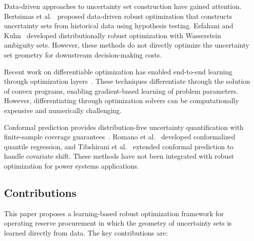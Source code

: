 \documentclass[lettersize,journal]{IEEEtran}
\theoremstyle{definition}
\begin{document}
Data-driven approaches to uncertainty set construction have gained attention. Bertsimas et al.~\cite{Bertsimas2018} proposed data-driven robust optimization that constructs uncertainty sets from historical data using hypothesis testing. Esfahani and Kuhn~\cite{Esfahani2018} developed distributionally robust optimization with Wasserstein ambiguity sets. However, these methods do not directly optimize the uncertainty set geometry for downstream decision-making costs.

Recent work on differentiable optimization has enabled end-to-end learning through optimization layers~\cite{Amos2017,Agrawal2019}. These techniques differentiate through the solution of convex programs, enabling gradient-based learning of problem parameters. However, differentiating through optimization solvers can be computationally expensive and numerically challenging.

Conformal prediction provides distribution-free uncertainty quantification with finite-sample coverage guarantees~\cite{Vovk2005}. Romano et al.~\cite{Romano2019} developed conformalized quantile regression, and Tibshirani et al.~\cite{Tibshirani2019} extended conformal prediction to handle covariate shift. These methods have not been integrated with robust optimization for power systems applications.

\subsection{Contributions}

This paper proposes a learning-based robust optimization framework for operating reserve procurement in which the geometry of uncertainty sets is learned directly from data. The key contributions are:
\end{document}
